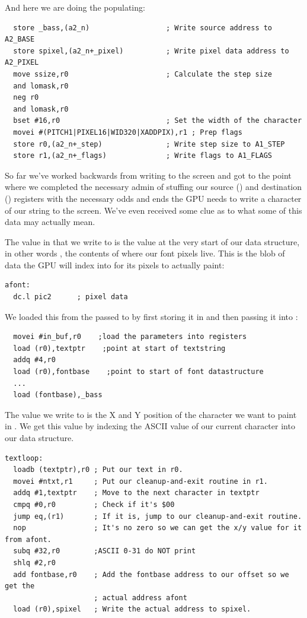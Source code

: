 And here we are doing the populating:

\begin{lstlisting}
  store _bass,(a2_n)                  ; Write source address to A2_BASE
  store spixel,(a2_n+_pixel)          ; Write pixel data address to A2_PIXEL
  move ssize,r0                       ; Calculate the step size
  and lomask,r0 
  neg r0
  and lomask,r0
  bset #16,r0                         ; Set the width of the character
  movei #(PITCH1|PIXEL16|WID320|XADDPIX),r1 ; Prep flags
  store r0,(a2_n+_step)               ; Write step size to A1_STEP 
  store r1,(a2_n+_flags)              ; Write flags to A1_FLAGS
\end{lstlisting}

So far we've worked backwards from writing to the screen and got to the point where we completed the necessary admin of stuffing our
source () and destination () registers with the necessary odds and ends the GPU needs to write a character of our string to the
screen.  We've even received some clue as to what some of this data may actually mean.

The value in  that we write to  is the value at the very start of our  data structure, in other words , the contents
of  where our font pixels live. This is the blob of data the GPU will index into for its pixels to actually paint:
\begin{lstlisting}
afont:  
  dc.l pic2      ; pixel data
\end{lstlisting}

We loaded this from the  passed to  by first storing it in  and then passing it into :
\begin{lstlisting}
  movei #in_buf,r0    ;load the parameters into registers
  load (r0),textptr    ;point at start of textstring
  addq #4,r0
  load (r0),fontbase    ;point to start of font datastructure
  ...
  load (fontbase),_bass
\end{lstlisting}

The value  we write to  is the X and Y position of the character we want to paint in . We get this
value by indexing the ASCII value of our current character into our  data structure. 

\begin{lstlisting}
textloop:
  loadb (textptr),r0 ; Put our text in r0.
  movei #ntxt,r1     ; Put our cleanup-and-exit routine in r1.
  addq #1,textptr    ; Move to the next character in textptr
  cmpq #0,r0         ; Check if it's $00
  jump eq,(r1)       ; If it is, jump to our cleanup-and-exit routine.
  nop                ; It's no zero so we can get the x/y value for it from afont.
  subq #32,r0        ;ASCII 0-31 do NOT print
  shlq #2,r0
  add fontbase,r0    ; Add the fontbase address to our offset so we get the
                     ; actual address afont
  load (r0),spixel   ; Write the actual address to spixel.
\end{lstlisting}


